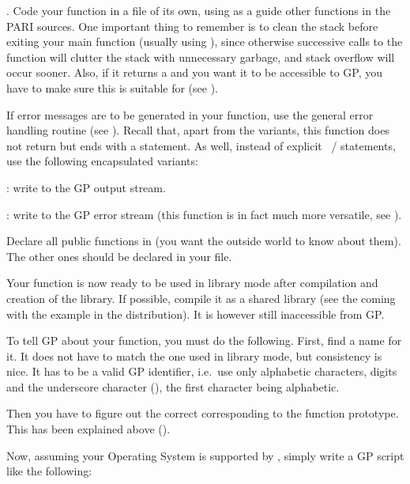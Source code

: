 .
\noindent
Code your function in a file of its own, using as a guide other functions
in the PARI sources. One important thing to remember is to clean the stack
before exiting your main function (usually using ), since
otherwise successive calls to the function will clutter the stack with
unnecessary garbage, and stack overflow will occur sooner. Also, if it
returns a  and you want it to be accessible to GP, you have to
make sure this  is suitable for  (see
).

If error messages are to be generated in your function, use the general
error handling routine  (see ). Recall that, apart
from the  variants, this function does not return but ends with
a  statement. As well, instead of explicit ~/
 statements, use the following encapsulated variants:

: write  to the GP output stream.

: write  to the GP error stream (this
function is in fact much more versatile, see ).

Declare all public functions in  (you want the outside
world to know about them). The other ones should be declared  in
your file.

Your function is now ready to be used in library mode after compilation and
creation of the library. If possible, compile it as a shared library (see
the  coming with the  example in the
distribution). It is however still inaccessible from GP.\smallskip


To tell GP about your function, you must do the following. First, find a
name for it. It does not have to match the one used in library mode, but
consistency is nice. It has to be a valid GP identifier, i.e.~use only
alphabetic characters, digits and the underscore character (\kbd{\_}), the
first character being alphabetic.

Then you have to figure out the correct  corresponding to
the function prototype. This has been explained above
().

Now, assuming your Operating System is supported by , simply
write a GP script like the following:

